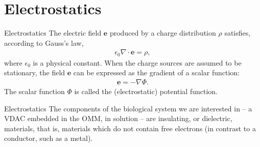 \documentclass{beamer}
\newcommand{\ez}{\epsilon_0}
\newcommand{\ee}{{\mathbf e}}
\begin{document}
\section{Electrostatics}
\begin{frame}{Electrostatics}
The electric field $\ee$ produced by a charge distribution $\rho$ satisfies, according to Gauss's law, 
    \begin{align}\label{eq:gauss}
        \ez \nabla \cdot \ee = \rho,
    \end{align}
where $\ez$ is a physical constant. When the charge sources are assumed to be stationary, the field $\ee$ can be expressed as the gradient of a scalar function:
\begin{align}\label{eq:irrotational}
    \ee = -\nabla \Phi.
\end{align}
The scalar function $\Phi$ is called the (electrostatic) potential function. 
\end{frame}
\begin{frame}{Electrostatics}
    The components of the biological system we are interested in -- a VDAC embedded in the OMM, in solution -- are insulating, or dielectric, materials, that is, materials which do not contain free electrons (in contrast to a conductor, such as a metal).  
\end{frame}
\end{document}
